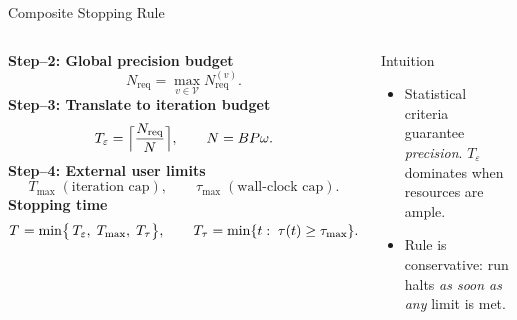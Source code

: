 \begin{frame}{Composite Stopping Rule}
\footnotesize
\begin{columns}
    \textbf{Step--2: Global precision budget}
  \[
     N_{\text{req}} = \max_{v \in \mathcal V} N^{(v)}_{\text{req}}.
  \]
  \textbf{Step--3: Translate to iteration budget}
  \[
     T_{\varepsilon} = \Bigl\lceil \frac{N_{\text{req}}}{N}\Bigr\rceil, \qquad N = B P \omega.
  \]
  \textbf{Step--4: External user limits}
  \[
    T_{\max}\; (\text{iteration cap}), \qquad \tau_{\max}\; (\text{wall-clock cap}).
  \]
  \textbf{Stopping time}
  \[
     T^{\*} = \min \bigl\{\, T_{\varepsilon},\; T_{\max},\; T_{\tau}\bigr\}, \qquad T_{\tau}=\min\{ t:\;\tau(t)\ge \tau_{\max}\}.
  \]

    \begin{block}{Intuition}
      \begin{itemize}
        \item Statistical criteria guarantee \emph{precision}.  $T_{\varepsilon}$ dominates when resources are ample.
        \item Rule is conservative: run halts \emph{as soon as any} limit is met.
      \end{itemize}
    \end{block}
\end{columns}
\end{frame}



